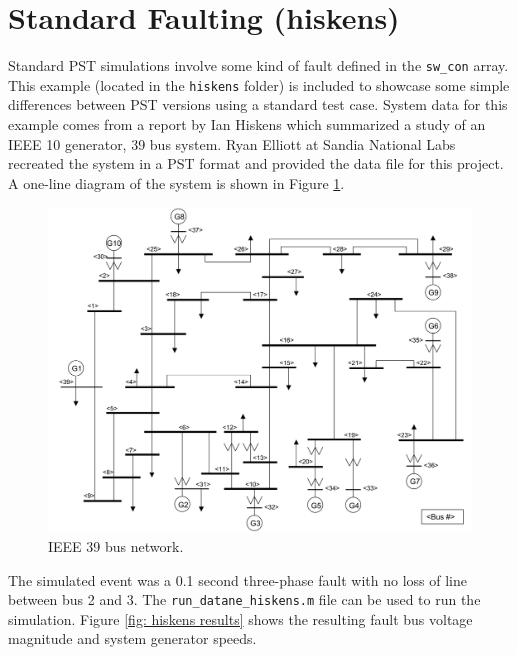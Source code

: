\pagebreak
\section{Standard Faulting (hiskens)}
Standard PST simulations involve some kind of fault defined in the \verb|sw_con| array.
This example (located in the \verb|hiskens| folder) is included to showcase some simple differences between PST versions using a standard test case.
System data for this example comes from a report by Ian Hiskens \cite{hiskens2013} which summarized a study of an IEEE 10 generator, 39 bus system.
Ryan Elliott at Sandia National Labs recreated the system in a PST format and provided the data file for this project.
A one-line diagram of the system is shown in Figure \ref{fig: hiskens oneline}.

\begin{figure}[H]
	\centering
	\footnotesize
	\includegraphics[width=.85\linewidth]{figures/hiskens/hiskensOneline}
	\caption{IEEE 39 bus network.}
	\label{fig: hiskens oneline}
\end{figure}%

The simulated event was a 0.1 second three-phase fault with no loss of line between bus 2 and 3.
The \verb|run_datane_hiskens.m| file can be used to run the simulation.
Figure \ref{fig: hiskens results} shows the resulting fault bus voltage magnitude and system generator speeds.


